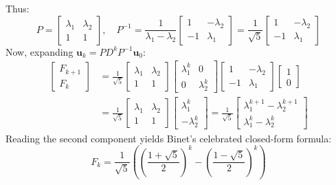 Thus:
\begin{equation}
P = \begin{bmatrix} \lambda_1 & \lambda_2 \\ 1 & 1 \end{bmatrix}, \quad P^{-1} = \frac{1}{\lambda_1 - \lambda_2} \begin{bmatrix} 1 & -\lambda_2 \\ -1 & \lambda_1 \end{bmatrix} = \frac{1}{\sqrt{5}} \begin{bmatrix} 1 & -\lambda_2 \\ -1 & \lambda_1 \end{bmatrix}
\end{equation}
Now, expanding $\mathbf{u}_k = P D^k P^{-1} \mathbf{u}_0$:
\begin{align}
\begin{bmatrix} F_{k+1} \\ F_k \end{bmatrix} &= \frac{1}{\sqrt{5}} \begin{bmatrix} \lambda_1 & \lambda_2 \\ 1 & 1 \end{bmatrix} \begin{bmatrix} \lambda_1^k & 0 \\ 0 & \lambda_2^k \end{bmatrix} \begin{bmatrix} 1 & -\lambda_2 \\ -1 & \lambda_1 \end{bmatrix} \begin{bmatrix} 1 \\ 0 \end{bmatrix} \nonumber \\
&= \frac{1}{\sqrt{5}} \begin{bmatrix} \lambda_1 & \lambda_2 \\ 1 & 1 \end{bmatrix} \begin{bmatrix} \lambda_1^k \\ -\lambda_2^k \end{bmatrix} = \frac{1}{\sqrt{5}} \begin{bmatrix} \lambda_1^{k+1} - \lambda_2^{k+1} \\ \lambda_1^k - \lambda_2^k \end{bmatrix}
\end{align}
Reading the second component yields Binet's celebrated closed-form formula:
\begin{equation}
F_k = \frac{1}{\sqrt{5}} \left( \left(\frac{1 + \sqrt{5}}{2}\right)^k - \left(\frac{1 - \sqrt{5}}{2}\right)^k \right)
\label{eq:binet}
\end{equation}

